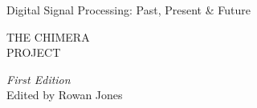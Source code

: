 \newpage
\thispagestyle{empty}
\vspace*{4cm}

\newfontfamily{}

{ %
\noindent\parbox{\textwidth}{\centering

  {\loretta\fontsize{11}{13}\selectfont Digital Signal Processing: Past, Present \& Future}

  \vspace{3cm}

  {
    \trajantitle
    \fontsize{32}{38}\selectfont
    
    THE CHIMERA \\[18pt]
    PROJECT
  }

  \vspace{2cm}


{\loretta\large\textit{First Edition}} \\[1cm]
{\loretta\large Edited by Rowan Jones}

  \vspace{2cm}

} %
} %

\newpage

